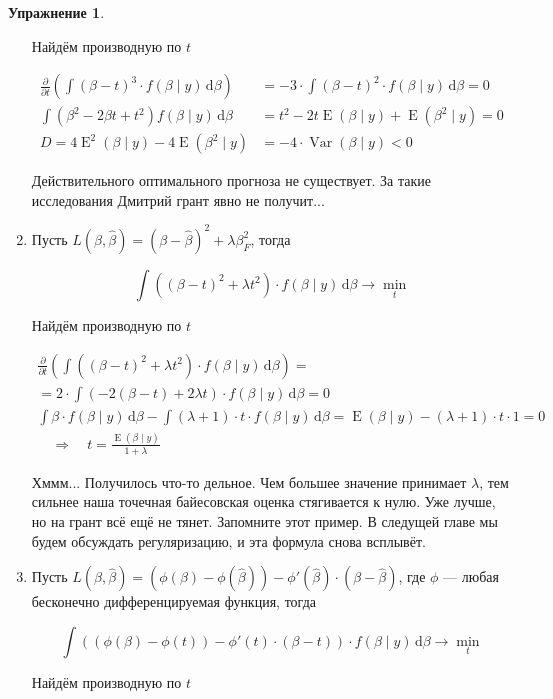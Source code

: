 \documentclass[12pt, a4paper, oneside]{extreport}
\DeclareMathOperator{\Var}{Var}
\DeclareMathOperator{\E}{\mathop{E}}
\def \hb{\hat{\beta}}
\def \b{\beta}
\newcommand{\dx}[1]{\,\mathrm{d}#1} %
\theoremstyle{plain}              %
\theoremstyle{definition}         %
\newtheorem{problem}{\color{myblue} Упражнение}
\begin{document}
\begin{problem}
\begin{sol}
\begin{enumerate}
Найдём производную по $t$

\begin{align*}
\frac{\partial }{\partial t} \left(  \int (\beta - t)^3 \cdot f(\beta \mid y) \dx{\beta}   \right) &= - 3 \cdot \int (\beta - t)^2 \cdot f(\beta \mid y) \dx{\beta} = 0 \\ 
\int (\beta^2 - 2\b t + t^2) f(\beta \mid y) \dx{\b} &= t^2 - 2t \E(\b \mid y) + \E(\b^2 \mid y) = 0\\
D = 4 \E^2(\b \mid y) - 4 \E(\b^2 \mid y) &= - 4 \cdot\Var(\beta \mid y) < 0 
\end{align*}

Действительного оптимального прогноза не существует. За такие исследования Дмитрий грант явно не получит...

\item Пусть $L(\beta, \hb) = (\beta - \hb)^2 + \lambda \b_F^2$, тогда 

\[ \int ((\beta - t)^2 + \lambda t^2) \cdot f(\beta \mid y) \dx{\beta} \to \min_{t} \] 

Найдём производную по $t$

\begin{multline*}
\frac{\partial }{\partial t} \left(  \int ((\beta - t)^2 + \lambda t^2) \cdot f(\beta \mid y) \dx{\beta}   \right) = \\ =  2 \cdot \int (-2(\beta - t) + 2 \lambda t) \cdot f(\beta \mid y) \dx{\beta} = 0 \\ 
\int \beta \cdot f(\beta \mid y) \dx{\beta} - \int (\lambda + 1) \cdot t \cdot f(\beta \mid y) \dx{\beta} = \E(\beta \mid y) - (\lambda + 1) \cdot t \cdot 1 =  0 \\ \quad \Rightarrow \quad t = \frac{\E(\beta \mid y)}{1 + \lambda}  
\end{multline*}

Хммм... Получилось что-то дельное. Чем большее значение принимает $\lambda$, тем сильнее наша точечная байесовская оценка стягивается к нулю. Уже лучше, но на грант всё ещё не тянет.  Запомните этот пример. В следущей главе мы будем обсуждать регуляризацию, и эта формула снова всплывёт. 

\item Пусть $L(\beta, \hb) = (\phi(\beta) - \phi(\hb)) - \phi'(\hb) \cdot(\b - \hb) $, где $\phi$ --- любая бесконечно дифференцируемая функция, тогда 

\[ \int ((\phi(\beta) - \phi(t)) - \phi'(t) \cdot(\b - t) )\cdot f(\beta \mid y) \dx{\beta} \to \min_{t} \] 

Найдём производную по $t$


\end{enumerate}
\end{sol}
\end{problem}
\end{document}
